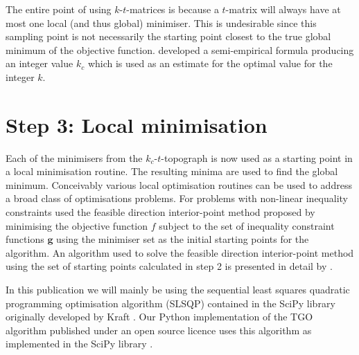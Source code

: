 %
The entire point of using $k$-$t$-matrices is because a $t$-matrix will always have at most one local (and thus global) minimiser. This is undesirable since this sampling point is not necessarily the starting point closest to the true global minimum of the objective function. \citet{Henderson2015} developed a semi-empirical formula producing an integer value $k_c$ which is used as an estimate for the optimal value for the integer $k$.
 
 
\section{Step 3: Local minimisation} \label{sec:tgo3}
Each of the minimisers from the  $k_c$-$t$-topograph is now used as a starting point in a local minimisation routine. The resulting minima are used to find the global minimum. Conceivably various local optimisation routines can be used to address a broad class of optimisations problems. For problems with non-linear inequality constraints \citet{Henderson2015} used the feasible direction interior-point method proposed by \citet{Herskovits1998} minimising the objective function $f$ subject to the set of inequality constraint functions $\mathbf{g}$ using the minimiser set as the initial starting points for the algorithm. An algorithm used to solve the feasible direction interior-point method using the set of starting points calculated in step 2 is presented in detail by \citet{Henderson2015}. 

In this publication we will mainly be using the sequential least squares quadratic programming optimisation algorithm (SLSQP) contained in the SciPy library originally developed by Kraft \cite{Kraft1988, Kraft1994}. Our Python implementation of the TGO algorithm published under an open source licence uses this algorithm as implemented in the SciPy library \cite{TGOpy, scipy}.

